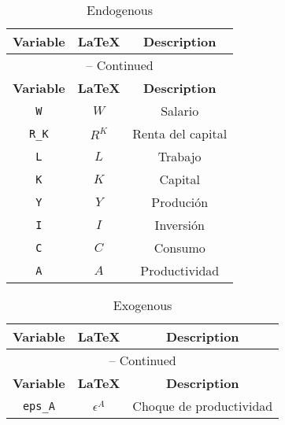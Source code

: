 \begin{center}
\begin{longtable}{ccc}
\caption{Endogenous}\\%
\hline%
\multicolumn{1}{c}{\textbf{Variable}} &
\multicolumn{1}{c}{\textbf{\LaTeX}} &
\multicolumn{1}{c}{\textbf{Description}}\\%
\hline\hline%
\endfirsthead
\multicolumn{3}{c}{{\tablename} \thetable{} -- Continued}\\%
\hline%
\multicolumn{1}{c}{\textbf{Variable}} &
\multicolumn{1}{c}{\textbf{\LaTeX}} &
\multicolumn{1}{c}{\textbf{Description}}\\%
\hline\hline%
\endhead
\texttt{W} & $W$ & Salario\\
\texttt{R\_K} & $R^{K}$ & Renta del capital\\
\texttt{L} & $L$ & Trabajo\\
\texttt{K} & $K$ & Capital\\
\texttt{Y} & $Y$ & Produción\\
\texttt{I} & $I$ & Inversión\\
\texttt{C} & $C$ & Consumo\\
\texttt{A} & $A$ & Productividad\\
\hline%
\end{longtable}
\end{center}
\begin{center}
\begin{longtable}{ccc}
\caption{Exogenous}\\%
\hline%
\multicolumn{1}{c}{\textbf{Variable}} &
\multicolumn{1}{c}{\textbf{\LaTeX}} &
\multicolumn{1}{c}{\textbf{Description}}\\%
\hline\hline%
\endfirsthead
\multicolumn{3}{c}{{\tablename} \thetable{} -- Continued}\\%
\hline%
\multicolumn{1}{c}{\textbf{Variable}} &
\multicolumn{1}{c}{\textbf{\LaTeX}} &
\multicolumn{1}{c}{\textbf{Description}}\\%
\hline\hline%
\endhead
\texttt{eps\_A} & $\epsilon^{A}$ & Choque de productividad\\
\hline%
\end{longtable}
\end{center}
